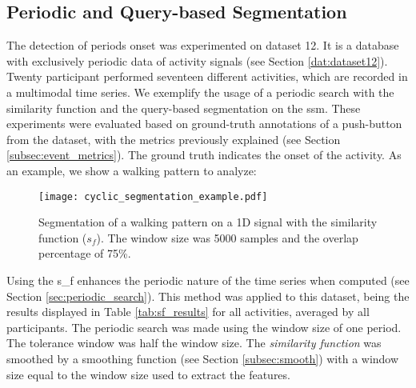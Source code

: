 
\subsection{Periodic and Query-based Segmentation}

The detection of periods onset was experimented on dataset 12. It is a database with exclusively periodic data of activity signals (see Section \ref{dat:dataset12}). Twenty participant performed seventeen different activities, which are recorded in a multimodal time series. 
We exemplify the usage of a periodic search with the similarity function and the query-based segmentation on the \gls{ssm}. These experiments were evaluated based on ground-truth annotations of a push-button from the dataset, with the metrics previously explained (see Section \ref{subsec:event_metrics}). The ground truth indicates the onset of the activity. As an example, we show a walking pattern to analyze:

\begin{figure}
\texttt{[image: cyclic\_segmentation\_example.pdf]}
\caption{Segmentation of a walking pattern on a 1D signal with the similarity function ($s_f$). The window size was 5000 samples and the overlap percentage of 75\%.}
\label{fig:cyclic_example}
\end{figure}

Using the \gls{s_f} enhances the periodic nature of the time series when computed (see Section \ref{sec:periodic_search}). This method was applied to this dataset, being the results displayed in Table \ref{tab:sf_results} for all activities, averaged by all participants. The periodic search was made using the window size of one period. The tolerance window was half the window size. The \textit{similarity function} was smoothed by a smoothing function (see Section \ref{subsec:smooth}) with a window size equal to the window size used to extract the features.

